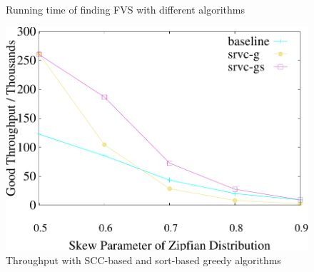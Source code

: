 \begin{figure}[t]
\begin{minipage}[b]{0.32\linewidth}
        \caption{Running time of finding FVS with different algorithms}
        \label{fig:fvs:latency}
    \end{minipage}
    \begin{minipage}[b]{0.32\linewidth}
        \centering
        \includegraphics[width=\textwidth]{./exp_fig/greedy/tps}
        \vspace{-2em}
        \caption{Throughput with SCC-based and sort-based greedy algorithms}
        \label{fig:greedy:tps}
    \end{minipage}
    \vspace{-1em}
\end{figure}

